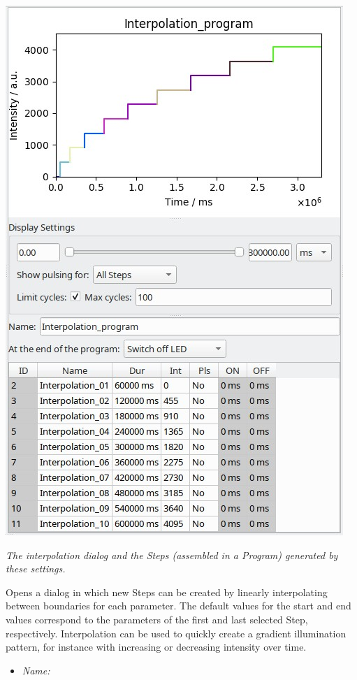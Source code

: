 \begin{itemize}
  \includegraphics{images/interpolation_example.jpg}

  \emph{The interpolation dialog and the Steps (assembled in a Program)
  generated by these settings.}

  Opens a dialog in which new Steps can be created by linearly
  interpolating between boundaries for each parameter. The default
  values for the start and end values correspond to the parameters of
  the first and last selected Step, respectively. Interpolation can be
  used to quickly create a gradient illumination pattern, for instance
  with increasing or decreasing intensity over time.

  \begin{itemize}
  \tightlist
  \item
    \emph{Name:}
  \end{itemize}


\end{itemize}
